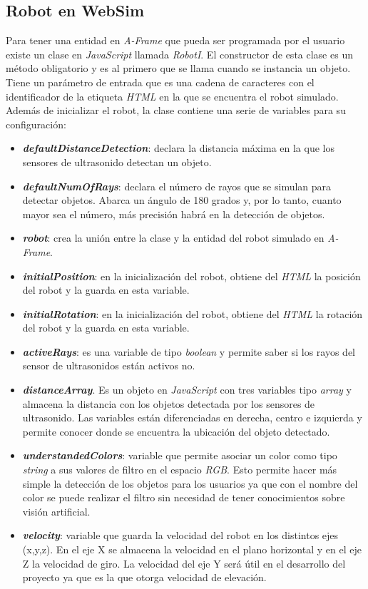 \subsection{Robot en WebSim}
\label{subsec:robot}
Para tener una entidad en \textit{A-Frame} que pueda ser programada por el usuario existe un clase en \textit{JavaScript} llamada \textit{RobotI}.
El constructor de esta clase es un método obligatorio y es al primero que se llama cuando se instancia un objeto. 
Tiene un parámetro de entrada que es una cadena de caracteres con el identificador de la etiqueta \textit{HTML} en la que se encuentra el robot simulado. 
Además de inicializar el robot, la clase contiene una serie de variables para su configuración: 
\begin{itemize}
    \item \textit{\textbf{defaultDistanceDetection}}: declara la distancia máxima en la que los sensores de ultrasonido detectan un objeto.
    \item \textit{\textbf{defaultNumOfRays}}: declara el número de rayos que se simulan para detectar objetos. Abarca un ángulo de 180 grados y, por lo tanto, cuanto mayor sea el número, más precisión habrá en la detección de objetos. 
    \item \textit{\textbf{robot}}: crea la unión entre la clase y la entidad del robot simulado en \textit{A-Frame}.
    \item \textit{\textbf{initialPosition}}: en la inicialización del robot, obtiene del \textit{HTML} la posición del robot y la guarda en esta variable.  
    \item \textit{\textbf{initialRotation}}: en la inicialización del robot, obtiene del \textit{HTML} la rotación del robot y la guarda en esta variable.  
    \item \textit{\textbf{activeRays}}: es una variable de tipo \textit{boolean} y permite saber si los rayos del sensor de ultrasonidos están activos no.
    \item \textit{\textbf{distanceArray}}. Es un objeto en \textit{JavaScript} con tres variables tipo \textit{array} y almacena la distancia con los objetos detectada por los sensores de ultrasonido. Las variables están diferenciadas en derecha, centro e izquierda y permite conocer donde se encuentra la ubicación del objeto detectado. 
    \item \textit{\textbf{understandedColors}}: variable que permite asociar un color como tipo \textit{string} a sus valores de filtro en el espacio \textit{RGB}. Esto permite hacer más simple la detección de los objetos para los usuarios ya que con el nombre del color se puede realizar el filtro sin necesidad de tener conocimientos sobre visión artificial.
    \item \textit{\textbf{velocity}}: variable que guarda la velocidad del robot en los distintos ejes (x,y,z). En el eje X se almacena la velocidad en el plano horizontal y en el eje Z la velocidad de giro. La velocidad del eje Y será útil en el desarrollo del proyecto ya que es la que otorga velocidad de elevación. 
\end{itemize}

